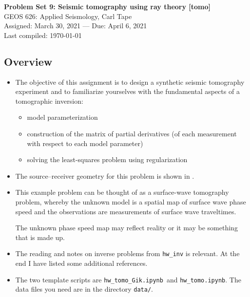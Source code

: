 \documentclass[11pt,titlepage,fleqn]{article}
\newcommand{\tfiletomo}{{\tt hw\_tomo.ipynb}}
\newcommand{\tfileGik}{{\tt hw\_tomo\_Gik.ipynb}}
\begin{document}

\begin{spacing}{1.2}
\centering
{\large \bf Problem Set 9: Seismic tomography using ray theory [tomo]} \\
GEOS 626: Applied Seismology, Carl Tape \\
Assigned: March 30, 2021 --- Due: April 6, 2021 \\
Last compiled: \today
\end{spacing}


\subsection*{Overview}

\begin{itemize}

\item The objective of this assignment is to design a synthetic seismic tomography experiment and to familiarize yourselves with the fundamental aspects of a tomographic inversion:
%
\begin{itemize}
\item model parameterization
\item construction of the matrix of partial derivatives (of each measurement with respect to each model parameter)
\item solving the least-squares problem using regularization
\end{itemize}

\item The source--receiver geometry for this problem is shown in .

\item This example problem can be thought of as a surface-wave tomography problem, whereby the unknown model is a spatial map of surface wave phase speed and the observations are measurements of surface wave traveltimes.

The unknown phase speed map may reflect reality or it may be something that is made up.

\item The reading and notes on inverse problems from \verb+hw_inv+ is relevant.
At the end I have listed some additional references.
\nocite{Tape2007,Menke,AsterE2,Tarantola2005}

\item 
The two template scripts are \tfileGik\ and \tfiletomo.
The data files you need are in the directory \verb+data/+. \\

\end{itemize}
\end{document}
